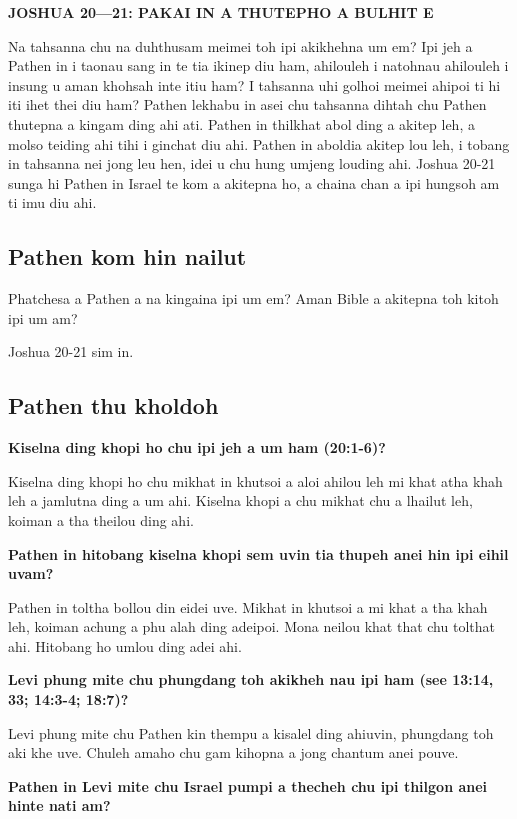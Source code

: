 \documentclass[11pt]{article}
\begin{document}
\textbf{\textbf{JOSHUA 20—21: PAKAI IN A THUTEPHO A BULHIT E}}

Na tahsanna chu na duhthusam meimei toh ipi akikhehna um em? Ipi jeh a
Pathen in i taonau sang in te tia ikinep diu ham, ahilouleh i natohnau
ahilouleh i insung u aman khohsah inte itiu ham? I tahsanna uhi golhoi
meimei ahipoi ti hi iti ihet thei diu ham? Pathen lekhabu in asei chu
tahsanna dihtah chu Pathen thutepna a kingam ding ahi ati. Pathen in
thilkhat abol ding a akitep leh, a molso teiding ahi tihi i ginchat
diu ahi. Pathen in aboldia akitep lou leh, i tobang in tahsanna nei
jong leu hen, idei u chu hung umjeng louding ahi. Joshua 20-21 sunga
hi Pathen in Israel te kom a akitepna ho, a chaina chan a ipi hungsoh
am ti imu diu ahi.

\subsection{Pathen kom hin nailut}
\label{sec:orga2408a0}

Phatchesa a Pathen a na kingaina ipi um em? Aman Bible a akitepna toh
kitoh ipi um am?

Joshua 20-21 sim in.

\subsection{Pathen thu kholdoh}
\label{sec:orgc82c194}

\textbf{\textbf{Kiselna ding khopi ho chu ipi jeh a um ham (20:1-6)?}}

Kiselna ding khopi ho chu mikhat in khutsoi a aloi ahilou leh mi khat
atha khah leh a jamlutna ding a um ahi. Kiselna khopi a chu mikhat chu
a lhailut leh, koiman a tha theilou ding ahi.

\textbf{\textbf{Pathen in hitobang kiselna khopi sem uvin tia thupeh anei hin ipi
 eihil uvam?}}

Pathen in toltha bollou din eidei uve. Mikhat in khutsoi a mi khat a
tha khah leh, koiman achung a phu alah ding adeipoi. Mona neilou khat
that chu tolthat ahi. Hitobang ho umlou ding adei ahi.

\textbf{\textbf{Levi phung mite chu phungdang toh akikheh nau ipi ham (see 13:14, 33; 14:3-4; 18:7)?}} 

Levi phung mite chu Pathen kin thempu a kisalel ding ahiuvin,
phungdang toh aki khe uve. Chuleh amaho chu gam kihopna a jong chantum
anei pouve.

\textbf{\textbf{Pathen in Levi mite chu Israel pumpi a thecheh chu ipi thilgon anei hinte nati am?}}
\end{document}
